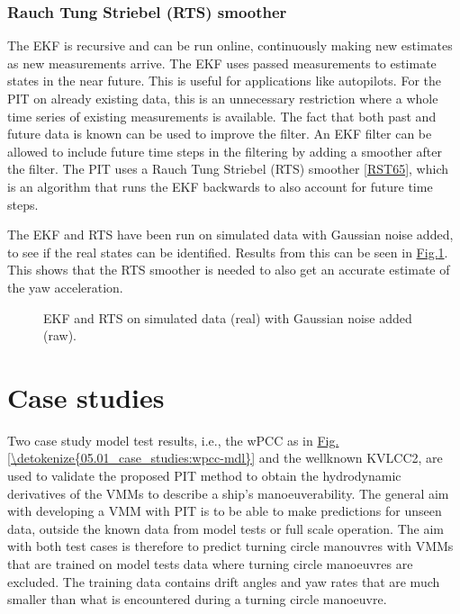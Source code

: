 \documentclass[review]{elsarticle}
\begin{document}
\subsubsection{Rauch Tung Striebel (RTS) smoother}
\label{\detokenize{04.01_EK:rauch-tung-striebel-rts-smoother}}\label{\detokenize{04.01_EK:rts}}
\sphinxAtStartPar
The EKF is recursive and can be run online, continuously making new estimates as new measurements arrive. The EKF uses passed measurements to estimate states in the near future. This is useful for applications like autopilots. For the PIT on already existing data, this is an unnecessary restriction where a whole time series of existing measurements is available. The fact that both past and future data is known can be used to improve the filter. An EKF filter can be allowed to include future time steps in the filtering by adding a smoother after the filter. The PIT uses a Rauch Tung Striebel (RTS) smoother {[}\hyperlink{cite.bibligraphy:id67}{RST65}{]}, which is an algorithm that runs the EKF backwards to also account for future time steps.

\sphinxAtStartPar
The EKF and RTS have been run on simulated data with Gaussian noise added, to see if the real states can be identified. Results from this can be seen in  \hyperref[\detokenize{04.01_EK:fig-ekf}]{Fig.\@ \ref{\detokenize{04.01_EK:fig-ekf}}}. This shows that the RTS smoother is needed to also get an accurate estimate of the yaw acceleration.

\begin{figure}[H]
\centering
\capstart

\noindent{}
\caption{EKF and RTS on simulated data (real) with Gaussian noise added (raw).}\label{\detokenize{04.01_EK:fig-ekf}}\end{figure}


\section{Case studies}
\label{\detokenize{05.01_case_studies:case-studies}}\label{\detokenize{05.01_case_studies:id1}}\label{\detokenize{05.01_case_studies::doc}}
\sphinxAtStartPar
Two case study model test results, i.e., the wPCC as in \hyperref[\detokenize{05.01_case_studies:wpcc-mdl}]{Fig.\@ \ref{\detokenize{05.01_case_studies:wpcc-mdl}}} and the well\sphinxhyphen{}known KVLCC2, are used to validate the proposed PIT method to obtain the hydrodynamic derivatives of the VMMs to describe a ship’s manoeuverability. The general aim with developing a VMM with PIT is to be able to make predictions for unseen data, outside the known data from model tests or full scale operation. The aim with both test cases is therefore to predict turning circle manouvres with VMMs that are trained on model tests data where turning circle manoeuvres are excluded. The training data contains drift angles and yaw rates that are much smaller than what is encountered during a turning circle manoeuvre.
\end{document}
